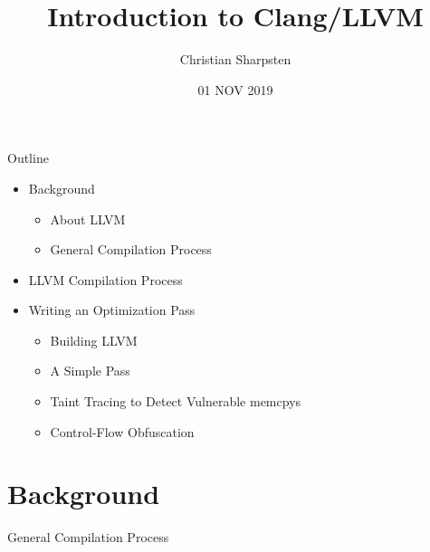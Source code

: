 \documentclass{beamer}
\title{Introduction to Clang/LLVM}
\author{Christian Sharpsten}
\date{01 NOV 2019}
\begin{document}

\begin{frame}
    \maketitle
\end{frame}

\begin{frame}{Outline}
    \begin{itemize}
        \item Background
        \begin{itemize}
            \item About LLVM
            \item General Compilation Process
        \end{itemize}
        \vspace{1ex}

        \item LLVM Compilation Process
        \vspace{1ex}

        \item Writing an Optimization Pass
        \begin{itemize}
            \item Building LLVM
            \item A Simple Pass
            \item Taint Tracing to Detect Vulnerable memcpys
            \item Control-Flow Obfuscation
        \end{itemize}
    \end{itemize}
\end{frame}


\section{Background} %


\begin{frame}{General Compilation Process}

\end{frame}
\end{document}
